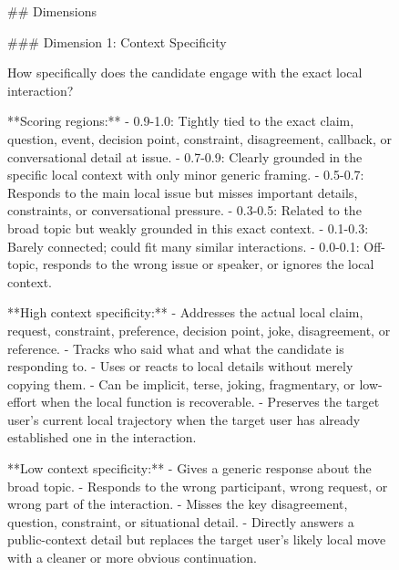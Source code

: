 \begin{figure}[p]
\centering

\begin{promptbox}
## Dimensions

### Dimension 1: Context Specificity

How specifically does the candidate engage with the exact local interaction?

**Scoring regions:**
- 0.9-1.0: Tightly tied to the exact claim, question, event, decision point, constraint, disagreement, callback, or conversational detail at issue.
- 0.7-0.9: Clearly grounded in the specific local context with only minor generic framing.
- 0.5-0.7: Responds to the main local issue but misses important details, constraints, or conversational pressure.
- 0.3-0.5: Related to the broad topic but weakly grounded in this exact context.
- 0.1-0.3: Barely connected; could fit many similar interactions.
- 0.0-0.1: Off-topic, responds to the wrong issue or speaker, or ignores the local context.

**High context specificity:**
- Addresses the actual local claim, request, constraint, preference, decision point, joke, disagreement, or reference.
- Tracks who said what and what the candidate is responding to.
- Uses or reacts to local details without merely copying them.
- Can be implicit, terse, joking, fragmentary, or low-effort when the local function is recoverable.
- Preserves the target user's current local trajectory when the target user has already established one in the interaction.

**Low context specificity:**
- Gives a generic response about the broad topic.
- Responds to the wrong participant, wrong request, or wrong part of the interaction.
- Misses the key disagreement, question, constraint, or situational detail.
- Directly answers a public-context detail but replaces the target user's likely local move with a cleaner or more obvious continuation.
\end{promptbox}
\end{figure}

